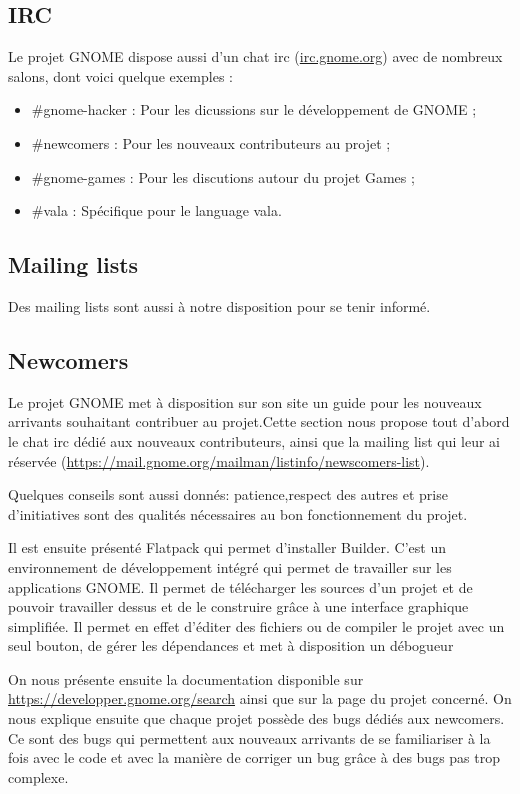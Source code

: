 \documentclass[12pt]{report}
\begin{document}
\subsection{IRC}
Le projet GNOME dispose aussi d'un chat irc (\url{irc.gnome.org})
avec de nombreux salons, dont voici quelque exemples :
\begin{itemize}
\item \#gnome-hacker : Pour les dicussions sur le développement de GNOME ;
\item \#newcomers : Pour les nouveaux contributeurs au projet ;
\item \#gnome-games : Pour les discutions autour du projet Games ;
\item \#vala : Spécifique pour le language vala.
\end{itemize}

\subsection{Mailing lists}
Des mailing lists sont aussi à notre disposition pour se tenir informé.

\subsection{Newcomers}
Le projet GNOME met à disposition sur son site un guide pour les nouveaux
arrivants souhaitant contribuer au projet.Cette section nous propose
tout d'abord le chat irc dédié aux nouveaux contributeurs, ainsi que la
mailing list qui leur ai réservée
(\url{https://mail.gnome.org/mailman/listinfo/newscomers-list}).

Quelques conseils sont aussi donnés: patience,respect des autres et prise
d'initiatives sont des qualités nécessaires au bon fonctionnement du projet.

Il est ensuite présenté Flatpack qui permet d'installer Builder.
C'est un environnement de développement intégré qui permet de travailler
sur les applications GNOME. Il permet de télécharger les sources d'un
projet et de pouvoir travailler dessus et de le construire grâce à une
interface graphique simplifiée. Il permet en effet d'éditer des fichiers
ou de compiler le projet avec un seul bouton, de gérer les dépendances
et met à disposition un débogueur

On nous présente ensuite la documentation disponible sur
\url{https://developper.gnome.org/search}
ainsi que sur la page du projet concerné. On nous explique ensuite que
chaque projet possède des bugs dédiés aux newcomers. Ce sont des bugs
qui permettent aux nouveaux arrivants de se familiariser à la fois avec
le code et avec la manière de corriger un bug grâce à des bugs pas trop
complexe.
\end{document}
